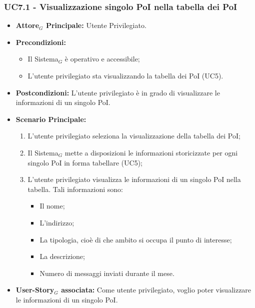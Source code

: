 \documentclass[10pt]{article}
\begin{document}
\begin{justify}
\subsubsection{\textbf{UC7.1 - Visualizzazione singolo PoI nella tabella dei PoI}}
\label{UC7.1}
\begin{itemize}
    \item \textbf{Attore$_G$ Principale:} Utente Privilegiato.
    \item \textbf{Precondizioni:} 
        \begin{itemize}
          \item Il Sistema$_G$ è operativo e accessibile;
            \item L'utente privilegiato sta visualizzando la tabella dei PoI (UC5).
        \end{itemize}
      \item \textbf{Postcondizioni:} L'utente privilegiato è in grado di visualizzare le informazioni di un singolo PoI.
    \item \textbf{Scenario Principale:} 
        \begin{enumerate}
        \item L'utente privilegiato seleziona la visualizzazione della tabella dei PoI;
          \item Il Sistema$_G$ mette a disposizioni le informazioni storicizzate per ogni singolo PoI in forma tabellare (UC5);
          \item L'utente privilegiato visualizza le informazioni di un singolo PoI nella tabella. Tali informazioni sono:
        \begin{itemize}
       \item Il nome;
       \item L'indirizzo;
       \item La tipologia, cioè di che ambito si occupa il punto di interesse;
       \item La descrizione;
         \item Numero di messaggi inviati durante il mese.
        \end{itemize}
        \end{enumerate}
    \item \textbf{User-Story$_G$ associata:} Come utente privilegiato, voglio poter visualizzare le informazioni di un singolo PoI.
\end{itemize}


\end{justify}
\end{document}

